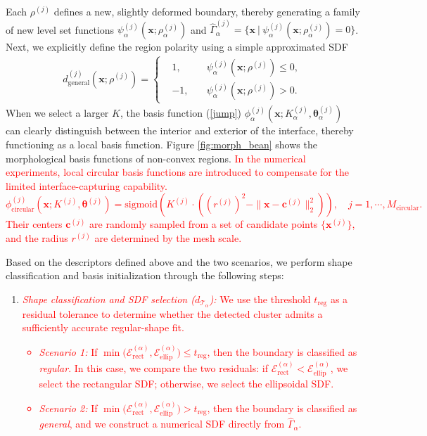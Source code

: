 \documentclass{article}
\newcommand{\red}[1]{\textcolor{red}{#1}}
\theoremstyle{plain}
\theoremstyle{definition}
\begin{document}
{Each $\rho^{(j)}$ defines a new,  slightly deformed boundary,  thereby generating a family of new level set functions $\psi_\alpha^{(j)}(\boldsymbol{x};\rho_\alpha^{(j)})$ and $\hat{\Gamma}^{(j)}_\alpha=\{\boldsymbol{x} \ |\ \psi_\alpha^{(j)}(\boldsymbol{x};\rho_\alpha^{(j)})=0\}$.  {Next, we explicitly define the region polarity using a simple approximated SDF
\begin{align}
\label{SDF}
d_{\text{general}}^{(j)}(\boldsymbol{x};\rho^{(j)})=\left \{
\begin{aligned}
&1,  \quad &\psi_\alpha^{(j)}(\boldsymbol{x};\rho^{(j)})\le 0 , \\
&-1,  \quad &\psi_\alpha^{(j)}(\boldsymbol{x};\rho^{(j)})> 0.
\end{aligned}
\right.
\end{align}
When we select a larger $K$, the basis function (\ref{jump}) $\phi_\alpha^{(j)}(\boldsymbol{x};K_\alpha^{(j)},\boldsymbol{\theta}_\alpha^{(j)})$ can clearly distinguish between the interior and exterior of the interface, thereby functioning as a local basis function. Figure \ref{fig:morph_bean} shows the morphological basis functions of non-convex regions.} \red{In the numerical experiments, local circular basis functions are introduced to compensate for the limited interface-capturing capability. 
$$
\phi^{(j)}_{\mathrm{circular}}(\boldsymbol{x};K^{(j)},\boldsymbol{\theta}^{(j)})
=\mathrm{sigmoid}\!\left(
K^{(j)}\cdot\left((r^{(j)})^2-\|\boldsymbol{x}-\boldsymbol{c}^{(j)}\|_2^2\right)
\right), \quad j=1,\cdots,M_{\mathrm{circular}}.
$$
Their centers $\boldsymbol{c}^{(j)}$ are randomly sampled from a set of candidate points $\{\boldsymbol{x}^{(j)}\}$, and the radius $r^{(j)}$ are determined by the mesh scale.}

 Based on the descriptors defined above and the two scenarios, we perform shape classification and basis initialization through the following steps:
  \begin{enumerate}
      \item \red{\emph{Shape classification and SDF selection ($d_{\mathcal{T}_\alpha}$):}
      We use the threshold $t_{\text{reg}}$ as a residual tolerance to determine whether the detected cluster admits a sufficiently accurate regular-shape fit.}
      \red{\begin{itemize}
          \item \emph{Scenario 1:} If $\min\bigl(\mathcal{E}_{\mathrm{rect}}^{(\alpha)},\mathcal{E}_{\mathrm{ellip}}^{(\alpha)}\bigr)\le t_{\text{reg}}$,
          then the boundary is classified as \emph{regular}. In this case, we compare the two residuals: if $\mathcal{E}_{\mathrm{rect}}^{(\alpha)}<\mathcal{E}_{\mathrm{ellip}}^{(\alpha)}$, we select the rectangular SDF; otherwise, we select the ellipsoidal SDF.
          \item \emph{Scenario 2:} If
$\min\bigl(\mathcal{E}_{\mathrm{rect}}^{(\alpha)},\mathcal{E}_{\mathrm{ellip}}^{(\alpha)}\bigr)> t_{\text{reg}}$,
          then the boundary is classified as \emph{general}, and we construct a numerical SDF directly from $\hat{\Gamma}_\alpha$.
      \end{itemize}}


\end{enumerate}}
\end{document}

